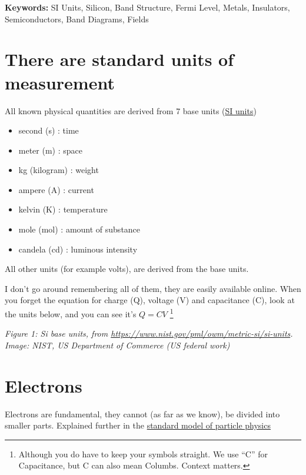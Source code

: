 \textbf{Keywords:} SI Units, Silicon, Band Structure, Fermi Level,
Metals, Insulators, Semiconductors, Band Diagrams, Fields

\section{There are standard units of
measurement}\label{there-are-standard-units-of-measurement}

All known physical quantities are derived from 7 base units
(\href{https://en.wikipedia.org/wiki/International_System_of_Units}{SI
units})

\begin{itemize}
\tightlist
\item
  second (s) : time
\item
  meter (m) : space
\item
  kg (kilogram) : weight
\item
  ampere (A) : current
\item
  kelvin (K) : temperature
\item
  mole (mol) : amount of substance
\item
  candela (cd) : luminous intensity
\end{itemize}

All other units (for example volts), are derived from the base units.

I don't go around remembering all of them, they are easily available
online. When you forget the equation for charge (Q), voltage (V) and
capacitance (C), look at the units below, and you can see it's \(Q=CV\)
\footnote{Although you do have to keep your symbols straight. We use
  ``C'' for Capacitance, but C can also mean Columbs. Context matters.}


{
\centering
{}
}

\emph{Figure 1: Si base units, from
\url{https://www.nist.gov/pml/owm/metric-si/si-units}. Image: NIST, US
Department of Commerce (US federal work)}

\section{Electrons}\label{electrons}

Electrons are fundamental, they cannot (as far as we know), be divided
into smaller parts. Explained further in the
\href{https://en.wikipedia.org/wiki/Standard_Model}{standard model of
particle physics}



